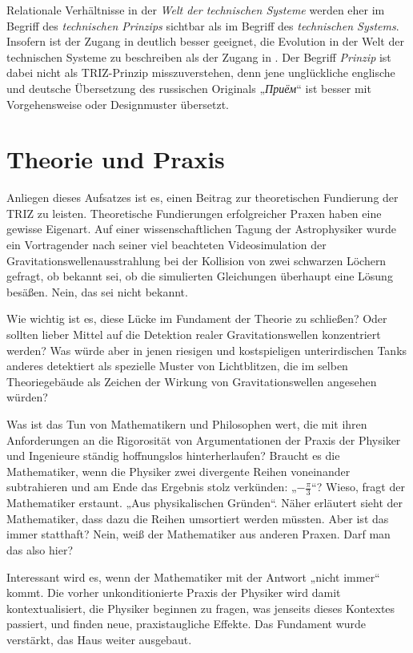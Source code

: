 \documentclass[12pt,a4paper]{article}
\begin{document}
Relationale Verhältnisse in der \emph{Welt der technischen Systeme} werden
eher im Begriff des \emph{technischen Prinzips} sichtbar als im Begriff des
\emph{technischen Systems}. Insofern ist der Zugang in \cite{Shpakovsky2010}
deutlich besser geeignet, die Evolution in der Welt der technischen Systeme zu
beschreiben als der Zugang in \cite{TESE2018}.  Der Begriff \emph{Prinzip} ist
dabei nicht als TRIZ-Prinzip misszuverstehen, denn jene unglückliche englische
und deutsche Übersetzung des russischen Originals
„\emph{\foreignlanguage{russian}{Приём}}“ ist besser mit Vorgehensweise oder
Designmuster übersetzt.

\section{Theorie und Praxis}

Anliegen dieses Aufsatzes ist es, einen Beitrag zur theoretischen Fundierung
der TRIZ zu leisten. Theoretische Fundierungen erfolgreicher Praxen haben eine
gewisse Eigenart. Auf einer wissenschaftlichen Tagung der Astrophysiker wurde
ein Vortragender nach seiner viel beachteten Videosimulation der
Gravitationswellenausstrahlung bei der Kollision von zwei schwarzen Löchern
gefragt, ob bekannt sei, ob die simulierten Gleichungen überhaupt eine Lösung
besäßen.  Nein, das sei nicht bekannt.

Wie wichtig ist es, diese Lücke im Fundament der Theorie zu schließen? Oder
sollten lieber Mittel auf die Detektion realer Gravitationswellen konzentriert
werden?  Was würde aber in jenen riesigen und kostspieligen unterirdischen
Tanks anderes detektiert als spezielle Muster von Lichtblitzen, die im selben
Theoriegebäude als Zeichen der Wirkung von Gravitationswellen angesehen
würden?

Was ist das Tun von Mathematikern und Philosophen wert, die mit ihren
Anforderungen an die Rigorosität von Argumentationen der Praxis der Physiker
und Ingenieure ständig hoffnungslos hinterherlaufen? Braucht es die
Mathematiker, wenn die Physiker zwei divergente Reihen voneinander
subtrahieren und am Ende das Ergebnis stolz verkünden: „$-\frac{\pi}{3}$“?
Wieso, fragt der Mathematiker erstaunt. „Aus physikalischen Gründen“.  Näher
erläutert sieht der Mathematiker, dass dazu die Reihen umsortiert werden
müssten.  Aber ist das immer statthaft? Nein, weiß der Mathematiker aus
anderen Praxen.  Darf man das also hier?

Interessant wird es, wenn der Mathematiker mit der Antwort „nicht immer“
kommt. Die vorher unkonditionierte Praxis der Physiker wird damit
kontextualisiert, die Physiker beginnen zu fragen, was jenseits dieses
Kontextes passiert, und finden neue, praxistaugliche Effekte.  Das Fundament
wurde verstärkt, das Haus weiter ausgebaut.
\end{document}
